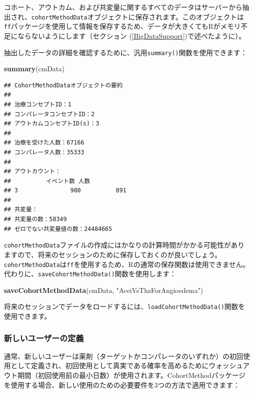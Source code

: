 \documentclass[
  11pt]{book}
\newenvironment{Shaded}{\begin{snugshade}}{\end{snugshade}}
\newcommand{\FunctionTok}[1]{\textcolor[rgb]{0.13,0.29,0.53}{\textbf{#1}}}
\newcommand{\NormalTok}[1]{#1}
\newcommand{\StringTok}[1]{\textcolor[rgb]{0.31,0.60,0.02}{#1}}
\theoremstyle{definition}
\theoremstyle{definition}
\theoremstyle{definition}
\theoremstyle{definition}
\theoremstyle{remark}
\begin{document}
コホート、アウトカム、および共変量に関するすべてのデータはサーバーから抽出され、\texttt{cohortMethodData}オブジェクトに保存されます。このオブジェクトは\texttt{ff}パッケージを使用して情報を保存するため、データが大きくてもRがメモリ不足にならないようにします（セクション (\ref{BigDataSupport})で述べたように）。

抽出したデータの詳細を確認するために、汎用\texttt{summary()}関数を使用できます：

\begin{Shaded}
\begin{Highlighting}[]
\FunctionTok{summary}\NormalTok{(cmData)}
\end{Highlighting}
\end{Shaded}

\begin{verbatim}
## CohortMethodDataオブジェクトの要約
## 
## 治療コンセプトID：1
## コンパレータコンセプトID：2
## アウトカムコンセプトID(s)：3
## 
## 治療を受けた人数：67166
## コンパレータ人数：35333
## 
## アウトカウント：
##          イベント数 人数
## 3               980          891
## 
## 共変量：
## 共変量の数：58349
## ゼロでない共変量値の数：24484665
\end{verbatim}

\texttt{cohortMethodData}ファイルの作成にはかなりの計算時間がかかる可能性がありますので、将来のセッションのために保存しておくのが良いでしょう。\texttt{cohortMethodData}は\texttt{ff}を使用するため、Rの通常の保存関数は使用できません。代わりに、\texttt{saveCohortMethodData()}関数を使用します：

\begin{Shaded}
\begin{Highlighting}[]
\FunctionTok{saveCohortMethodData}\NormalTok{(cmData, }\StringTok{"AceiVsThzForAngioedema"}\NormalTok{)}
\end{Highlighting}
\end{Shaded}

将来のセッションでデータをロードするには、\texttt{loadCohortMethodData()}関数を使用できます。

\subsubsection*{新しいユーザーの定義}\label{ux65b0ux3057ux3044ux30e6ux30fcux30b6ux30fcux306eux5b9aux7fa9}

通常、新しいユーザーは薬剤（ターゲットかコンパレータのいずれか）の初回使用として定義され、初回使用として真実である確率を高めるためにウォッシュアウト期間（初回使用前の最小日数）が使用されます。CohortMethodパッケージを使用する場合、新しい使用のための必要要件を3つの方法で適用できます：
\end{document}
